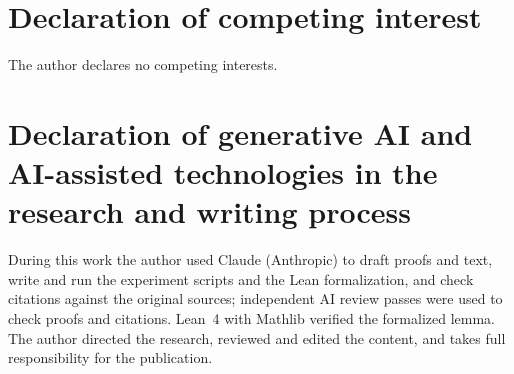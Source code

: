 \documentclass[preprint,12pt]{elsarticle}
\theoremstyle{definition}
\theoremstyle{remark}
\begin{document}
\section*{Declaration of competing interest}
The author declares no competing interests.

\section*{Declaration of generative AI and AI-assisted technologies in the research and writing process}
During this work the author used Claude (Anthropic) to draft proofs and text, write and run the experiment scripts and
the Lean formalization, and check citations against the original sources; independent AI review passes were used to
check proofs and citations. Lean~4 with Mathlib verified the formalized lemma. The author directed the research,
reviewed and edited the content, and takes full responsibility for the publication.

\appendix





\end{document}
